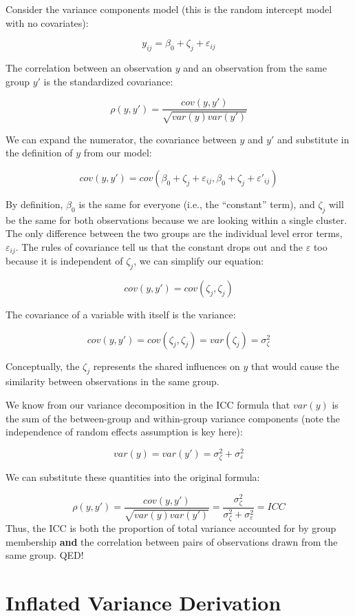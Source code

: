 \documentclass[
  letterpaper,
  DIV=11,
  numbers=noendperiod]{scrreprt}
\begin{document}
Consider the variance components model (this is the random intercept
model with no covariates):

\[
y_{ij} = \beta_0 + \zeta_j + \varepsilon_{ij}
\]

The correlation between an observation \(y\) and an observation from the
same group \(y'\) is the standardized covariance:

\[
\rho(y, y') = \frac{cov(y,y')}{\sqrt{var(y)var(y')}}
\]

We can expand the numerator, the covariance between \(y\) and \(y'\) and
substitute in the definition of \(y\) from our model:

\[
cov(y,y') = cov(\beta_0 + \zeta_j + \varepsilon_{ij}, \beta_0 + \zeta_j + \varepsilon'_{ij})
\]

By definition, \(\beta_0\) is the same for everyone (i.e., the
``constant'' term), and \(\zeta_j\) will be the same for both
observations because we are looking within a single cluster. The only
difference between the two groups are the individual level error terms,
\(\varepsilon_{ij}\). The rules of covariance tell us that the constant
drops out and the \(\varepsilon\) too because it is independent of
\(\zeta_j\), we can simplify our equation:

\[
cov(y,y') = cov(\zeta_j, \zeta_j) 
\]

The covariance of a variable with itself is the variance:

\[
cov(y,y') = cov(\zeta_j, \zeta_j) = var(\zeta_j) = \sigma^2_\zeta
\]

Conceptually, the \(\zeta_j\) represents the shared influences on \(y\)
that would cause the similarity between observations in the same group.

We know from our variance decomposition in the ICC formula that
\(var(y)\) is the sum of the between-group and within-group variance
components (note the independence of random effects assumption is key
here):

\[
var(y) = var(y') = \sigma^2_\zeta + \sigma^2_\varepsilon
\]

We can substitute these quantities into the original formula:

\[
\rho(y, y') = \frac{cov(y,y')}{\sqrt{var(y)var(y')}} = \frac{\sigma^2_\zeta}{\sigma^2_\zeta + \sigma^2_\varepsilon} = ICC
\] Thus, the ICC is both the proportion of total variance accounted for
by group membership \textbf{and} the correlation between pairs of
observations drawn from the same group. QED!

\chapter{Inflated Variance
Derivation}\label{inflated-variance-derivation}
\end{document}
